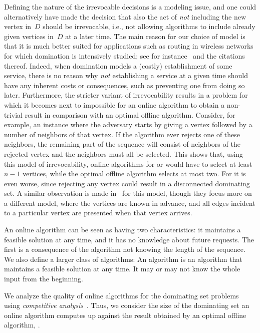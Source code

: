 Defining the nature of the irrevocable decisions is a
modeling issue, and one could alternatively have made the decision
that also the act of \emph{not} including the new vertex in~$D$ should
be irrevocable, i.e., not allowing algorithms to include already given
vertices in~$D$ at a later time.  The main reason for our choice of
model is that it is much better suited for applications such as
routing in wireless networks for which domination is intensively
studied; see for instance~\cite{DB97} and the citations
thereof. Indeed, when domination models a (costly) establishment of
some service, there is no reason why \emph{not} establishing a service
at a given time should have any inherent costs or consequences, such
as preventing one from doing so later.  Furthermore, the stricter
variant of irrevocability results in a problem for which it becomes
next to impossible for an online algorithm to obtain a non-trivial
result in comparison with an optimal offline algorithm.
Consider, for example, an instance
where the adversary starts by giving a vertex followed by a number
of neighbors of that vertex.  If the algorithm ever rejects one of
these neighbors, the remaining part of the sequence will consist of
neighbors of the rejected vertex and the neighbors must all be selected.  
This shows that, using this model
of irrevocability, online algorithms for \ds or \tds would have to
select at least $n-1$ vertices, while the optimal offline algorithm
selects at most two.
For \cds it is even worse, since rejecting any vertex
could result in a disconnected dominating set.
A similar observation is made in~\cite{KT97} for this model, though they
 focus more on a different model, where the vertices are known in
advance, and all edges incident to a particular vertex are presented
when that vertex arrives.

An online algorithm can be seen as having two characteristics:
it maintains a feasible solution at any time, and it has no knowledge
about future requests.
The first is a consequence of the algorithm not knowing the length of
the sequence.
We also define a larger class of algorithms:
An {\em \incr} algorithm is an algorithm that maintains a feasible
solution at any time.
It may or may not know the whole input from the beginning.

We analyze the quality of online algorithms for the dominating set problems
using \emph{competitive analysis}~\cite{ST85j,KMRS88j}.
Thus, we consider the size of the dominating set an online algorithm
computes up against the result obtained by an optimal offline algorithm, \opt.

